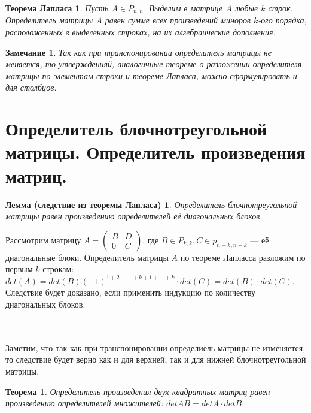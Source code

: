 \newtheorem*{t4_2}{Теорема Лапласа}
\begin{t4_2}
	Пусть $A \in P_{n,n}$. Выделим в матрице $A$ любые $k$ строк. Определитель матрицы $A$ равен сумме всех произведений миноров $k$-ого порядка, расположенных в выделенных строках, на их алгебраические дополнения.
\end{t4_2}
\newtheorem*{t4_3}{Замечание}
\begin{t4_3}
	Так как при транспонировании определитель матрицы не меняется, то утвержденияй, аналогичные теореме о разложении определителя матрицы по элементам строки и теореме Лапласа, можно сформулировать и для столбцов.
\end{t4_3}


\section{Определитель блочнотреугольной матрицы. Определитель произведения матриц.}
\newtheorem*{t5_1}{Лемма (следствие из теоремы Лапласа)}
\begin{t5_1}
	Определитель блочнотреугольной матрицы равен произведению определителей её диагональных блоков.
\end{t5_1}
\begin{Proof}
	Рассмотрим матрицу $A = \begin{pmatrix} B & D \\ 0 & C \end{pmatrix}$, где $ B \in P_{k,k}, C \in p_{n-k,n-k}$ --- её диагональные блоки. Определитель матрицы $A$ по теореме Лапласса разложим по первым $k$ строкам: $det(A) = det(B)(-1)^{1+2+\ldots+k+1+\ldots+k}\cdot det(C)
	= det(B)\cdot det(C).$ Следствие будет доказано, если применить индукцию по количеству диагональных блоков.
\end{Proof} 
\\\\
Заметим, что так как при транспонировании определиель матрицы не изменяется, то следствие будет верно как и для верхней, так и для нижней блочнотреугольной матрицы.
\newtheorem*{t5_2}{Теорема}
\begin{t5_2}
	Определитель произведения двух квадратных матриц равен произведению определителей множителей: $detAB = detA \cdot det B$.
\end{t5_2}
